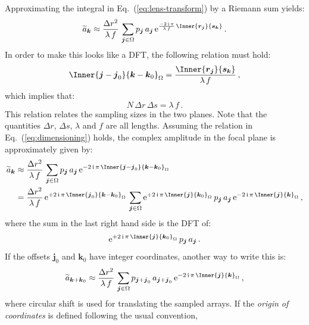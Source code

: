 \documentclass[a4paper,10pt,twocolumn]{scrartcl}
\newcommand*{\mathe}{\mathrm{e}}
\newcommand*{\mathi}{\mathrm{i}}
\newcommand*{\FT}[1]{\widetilde{#1}}
\newcommand*{\V}[1]{\boldsymbol{#1}}   %
\begin{document}
Approximating the integral in Eq.~(\ref{eq:lens-transform}) by a Riemann
sum yields:
\begin{equation}
  \FT{a}_{\V k} \approx \frac{\Delta r^2}{\lambda\,f} \,
  \sum_{\V j \in \Omega} p_{\V j} \, a_{\V j} \,
  \mathe^{\frac{-2\,\mathi\,\pi}{\lambda\,f}\,\Inner{\V r_{\V j}}{\V s_{\V k}}} \, .
  \label{eq:Riemann-approx}
\end{equation}
In order to make this looks like a DFT, the following relation must hold:
\begin{displaymath}
  \Inner{\V j - \V j_0}{\V k - \V k_0}_{\Omega}
  = \frac{\Inner{\V r_{\V j}}{\V s_{\V k}}}{\lambda\,f} \, ,
  \label{eq:dimensioning}
\end{displaymath}
which implies that:
\begin{equation}
  N\,\Delta r\,\Delta s = \lambda\,f \, .
\end{equation}
This relation relates the sampling sizes in the two planes.  Note that the
quantities $\Delta r$, $\Delta s$, $\lambda$ and $f$ are all lengths.
Assuming the relation in Eq.~(\ref{eq:dimensioning}) holds, the complex
amplitude in the focal plane is approximately given by:
\begin{align}
  \FT{a}_{\V k}
  &\approx \frac{\Delta r^2}{\lambda\,f} \, \sum_{\V j \in \Omega}
  p_{\V j} \, a_{\V j} \,
  \mathe^{-2\,\mathi\,\pi \, \Inner{\V j - \V j_0}{\V k - \V k_0}_{\Omega}} \,
  \notag\\
  &= \frac{\Delta r^2}{\lambda\,f} \,
  \mathe^{+2\,\mathi\,\pi \, \Inner{\V j_0}{\V k - \V k_0}_{\Omega}} \,
  \sum_{\V j \in \Omega}
  \mathe^{+2\,\mathi\,\pi \, \Inner{\V j}{\V k_0}_{\Omega}} \,
  p_{\V j} \, a_{\V j} \,
  \mathe^{-2\,\mathi\,\pi \, \Inner{\V j}{\V k}_{\Omega}} \, ,  
\end{align}
where the sum in the last right hand side is the DFT of:
\begin{displaymath}
  \mathe^{+2\,\mathi\,\pi \, \Inner{\V j}{\V k_0}_{\Omega}} \, p_{\V j} \,
  a_{\V j} \, .
\end{displaymath}
If the offsets $\V j_0$ and $\V k_0$ have integer coordinates, another way
to write this is:
\begin{equation}
  \FT{a}_{\V k + \V k_0} \approx \frac{\Delta r^2}{\lambda\,f} \,
  \sum_{\V j \in \Omega} p_{\V j + \V j_0} \, a_{\V j + \V j_0} \,
  \mathe^{-2\,\mathi\,\pi \, \Inner{\V j}{\V k}_{\Omega}} \, ,
\end{equation}
where circular shift is used for translating the sampled arrays.  If the
\emph{origin of coordinates} is defined following the usual convention,
\end{document}
